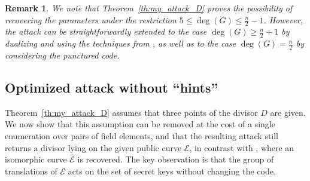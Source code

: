 \documentclass[sn-mathphys-num]{sn-jnl_modified}
\newtheorem{remark}{Remark}
\begin{document}
\begin{remark}
We note that Theorem~\ref{th:my_attack_D} proves the possibility of recovering the parameters under the restriction $5 \leq \deg(G) \leq \frac{n}{2}-1$. However, the attack can be straightforwardly extended to the case $\deg(G) \geq  \frac{n}{2}+1$ by dualizing and using the techniques from \cite{CMP17}, as well as to the case $\deg(G) = \frac{n}{2}$ by considering the punctured code.
\end{remark}





















\subsection{Optimized attack without ``hints''}\label{sec:attack_no_hints}

Theorem~\ref{th:my_attack_D} assumes that three points of the divisor $D$ are given. We now show that this assumption can be removed at the cost of a single enumeration over pairs of field elements, and that the resulting attack still returns a divisor lying on the given public curve $\mathcal{E}$, in contrast with \cite{Sh25}, where an isomorphic curve $\widehat{\mathcal{E}}$ is recovered. The key observation is that the group of translations of $\mathcal{E}$ acts on the set of secret keys without changing the code.
\end{document}
